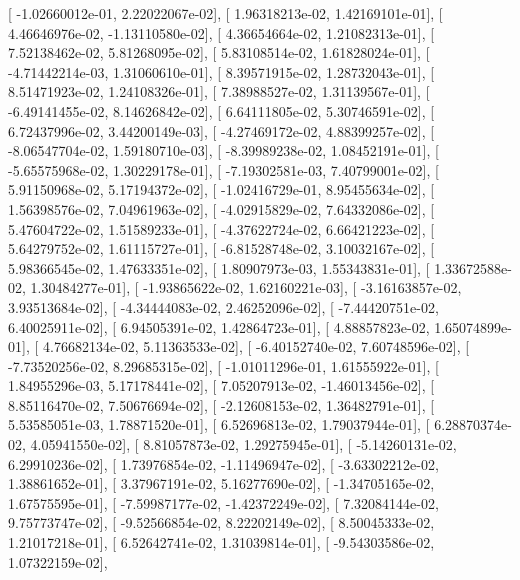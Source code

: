 \documentclass{article}
\begin{document}
       [ -1.02660012e-01,   2.22022067e-02],
       [  1.96318213e-02,   1.42169101e-01],
       [  4.46646976e-02,  -1.13110580e-02],
       [  4.36654664e-02,   1.21082313e-01],
       [  7.52138462e-02,   5.81268095e-02],
       [  5.83108514e-02,   1.61828024e-01],
       [ -4.71442214e-03,   1.31060610e-01],
       [  8.39571915e-02,   1.28732043e-01],
       [  8.51471923e-02,   1.24108326e-01],
       [  7.38988527e-02,   1.31139567e-01],
       [ -6.49141455e-02,   8.14626842e-02],
       [  6.64111805e-02,   5.30746591e-02],
       [  6.72437996e-02,   3.44200149e-03],
       [ -4.27469172e-02,   4.88399257e-02],
       [ -8.06547704e-02,   1.59180710e-03],
       [ -8.39989238e-02,   1.08452191e-01],
       [ -5.65575968e-02,   1.30229178e-01],
       [ -7.19302581e-03,   7.40799001e-02],
       [  5.91150968e-02,   5.17194372e-02],
       [ -1.02416729e-01,   8.95455634e-02],
       [  1.56398576e-02,   7.04961963e-02],
       [ -4.02915829e-02,   7.64332086e-02],
       [  5.47604722e-02,   1.51589233e-01],
       [ -4.37622724e-02,   6.66421223e-02],
       [  5.64279752e-02,   1.61115727e-01],
       [ -6.81528748e-02,   3.10032167e-02],
       [  5.98366545e-02,   1.47633351e-02],
       [  1.80907973e-03,   1.55343831e-01],
       [  1.33672588e-02,   1.30484277e-01],
       [ -1.93865622e-02,   1.62160221e-03],
       [ -3.16163857e-02,   3.93513684e-02],
       [ -4.34444083e-02,   2.46252096e-02],
       [ -7.44420751e-02,   6.40025911e-02],
       [  6.94505391e-02,   1.42864723e-01],
       [  4.88857823e-02,   1.65074899e-01],
       [  4.76682134e-02,   5.11363533e-02],
       [ -6.40152740e-02,   7.60748596e-02],
       [ -7.73520256e-02,   8.29685315e-02],
       [ -1.01011296e-01,   1.61555922e-01],
       [  1.84955296e-03,   5.17178441e-02],
       [  7.05207913e-02,  -1.46013456e-02],
       [  8.85116470e-02,   7.50676694e-02],
       [ -2.12608153e-02,   1.36482791e-01],
       [  5.53585051e-03,   1.78871520e-01],
       [  6.52696813e-02,   1.79037944e-01],
       [  6.28870374e-02,   4.05941550e-02],
       [  8.81057873e-02,   1.29275945e-01],
       [ -5.14260131e-02,   6.29910236e-02],
       [  1.73976854e-02,  -1.11496947e-02],
       [ -3.63302212e-02,   1.38861652e-01],
       [  3.37967191e-02,   5.16277690e-02],
       [ -1.34705165e-02,   1.67575595e-01],
       [ -7.59987177e-02,  -1.42372249e-02],
       [  7.32084144e-02,   9.75773747e-02],
       [ -9.52566854e-02,   8.22202149e-02],
       [  8.50045333e-02,   1.21017218e-01],
       [  6.52642741e-02,   1.31039814e-01],
       [ -9.54303586e-02,   1.07322159e-02],
\end{document}
